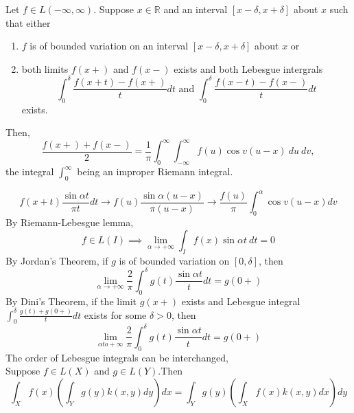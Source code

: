 \begin{theorem}
	Let \(f \in L(-\infty,\infty)\). Suppose \(x \in \mathbb{R}\) and an interval $[x-\delta,x+\delta]$ about $x$ such that either 
	\begin{enumerate}
		\item $f$ is of bounded variation on an interval $[x-\delta,x+\delta]$ about $x$ or
		\item both limits $f(x+)$ and $f(x-)$ exists and both Lebesgue intergrals
			\[ \int_0^\delta \frac{f(x+t)-f(x+)}{t} dt \text{ and }\int_0^\delta \frac{f(x-t)-f(x-)}{t} dt \]
			exists.
	\end{enumerate}
	Then, 
	\[ \frac{f(x+)+f(x-)}{2} = \frac{1}{\pi} \int_0^\infty \int_{-\infty}^\infty f(u)\cos v(u-x)\ du\ dv, \]
	the integral $\int_0^\infty$ being an improper Riemann integral.
\end{theorem}
\begin{synopsis}
	\[ f(x+t)\frac{\sin \alpha t}{\pi t} dt \to f(u)\frac{\sin \alpha(u-x)}{\pi(u-x)} \to \frac{f(u)}{\pi} \int_0^\alpha \cos v(u-x) dv \]
	By Riemann-Lebesgue lemma\cite[Theorem 11.6]{apostol},
	\[ f \in L(I) \implies \lim_{\alpha \to +\infty} \int_I f(x) \sin \alpha t\ dt = 0 \]
	By Jordan's Theorem\cite[Theorem 10.8]{apostol}, if $g$ is of bounded variation on $[0,\delta]$, then
	\[ \lim_{\alpha \to +\infty} \frac{2}{\pi} \int_0^\delta g(t) \frac{\sin \alpha t}{t} dt = g(0+) \]
	By Dini's Theorem\cite[Theorem 10.9]{apostol}, if the limit $g(x+)$ exists and Lebesgue integral \( \int_0^\delta \frac{g(t)+g(0+)}{t} dt \) exists for some \( \delta > 0 \), then
	\[ \lim_{\alpha to +\infty} \frac{2}{\pi} \int_0^\delta g(t) \frac{\sin \alpha t}{t} dt = g(0+) \]
	The order of Lebesgue integrals can be interchanged\cite[Theorem 10.40]{apostol},\\
	Suppose \(f \in L(X)\) and \(g \in L(Y)\).Then
	\[ \int_X f(x) \left(\int_Y g(y) k(x,y) dy \right) dx = \int_Y g(y) \left( \int_X f(x) k(x,y) dx \right) dy \]
\end{synopsis}
